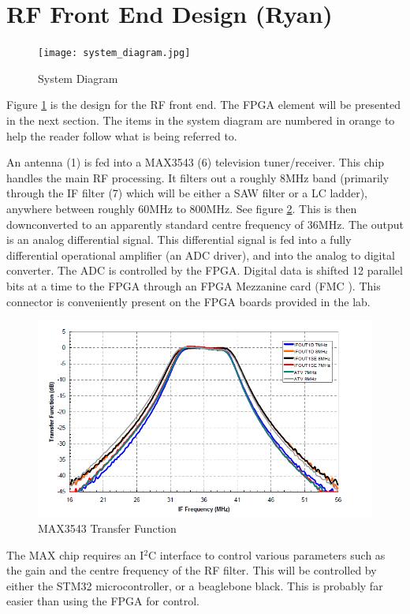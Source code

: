 \documentclass[a4paper, 12pt]{article}
\begin{document}
\section{RF Front End Design (Ryan)}

\begin{figure}
\caption{System Diagram}
\label{fig:system_diagram}
\centerline{\texttt{[image: system\_diagram.jpg]}}
\end{figure}

Figure \ref{fig:system_diagram} is the design for the RF front end.  The FPGA element will be presented in the next section.  The items in the system diagram are numbered in orange to help the reader follow what is being referred to.

An antenna (1) is fed into a MAX3543 (6) television tuner/receiver.  This chip handles the main RF processing.  It filters out a roughly 8MHz band (primarily through the IF filter (7) which will be either a SAW filter or a LC ladder), anywhere between roughly 60MHz to 800MHz.  See figure \ref{fig:transfer_function}.  This is then downconverted to an apparently standard centre frequency of 36MHz.  The output is an analog differential signal.  This differential signal is fed into a fully differential operational amplifier (an ADC driver), and into the analog to digital converter.  The ADC is controlled by the FPGA.  Digital data is shifted 12 parallel bits at a time to the FPGA through an FPGA Mezzanine card (FMC \cite{fmc}).  This connector is conveniently present on the FPGA boards provided in the lab.

\begin{figure}
\includegraphics[width=.48\textwidth]{../../../transfer_function.png}
\caption{MAX3543 Transfer Function}
\label{fig:transfer_function}
\end{figure}


The MAX chip requires an I$^2$C interface to control various parameters such as the gain and the centre frequency of the RF filter.  This will be controlled by either the STM32 microcontroller, or a beaglebone black.  This is probably far easier than using the FPGA for control.
\end{document}
